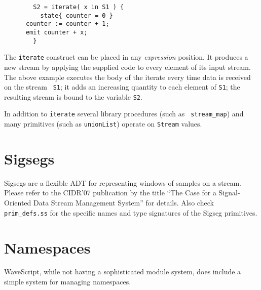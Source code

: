 \documentclass[twocolumn]{report}
\begin{document}
\begin{verbatim}
        S2 = iterate( x in S1 ) {
          state{ counter = 0 }
	  counter := counter + 1;
	  emit counter + x;
        }
\end{verbatim}

The {\tt iterate} construct can be placed in any {\em expression}
position.  It produces a new stream by applying the supplied code to
every element of its input stream.  The above example executes the
body of the iterate every time data is received on the stream {\tt
  S1}; it adds an increasing quantity to each element of {\tt S1}; the
resulting stream is bound to the variable {\tt S2}.

In addition to {\tt iterate} several library procedures (such as {\tt
stream\_map}) and many primitives (such as {\tt unionList}) operate on
{\tt Stream} values.





\section{Sigsegs}

Sigsegs are a flexible ADT for representing windows of samples on a stream.
Please refer to the CIDR'07 publication by the title 
``The Case for a Signal-Oriented Data Stream Management System'' for
details.  Also check {\tt prim\_defs.ss} for the specific names and
type signatures of the Sigseg primitives.






  






\section{Namespaces}

WaveScript, while not having a sophisticated module system, does
include a simple system for managing namespaces.
\end{document}
